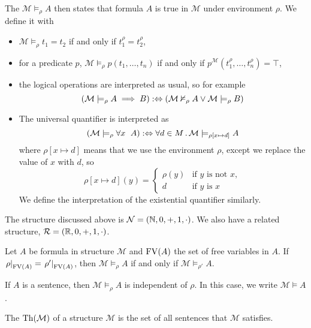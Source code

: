 The  $\mathcal{M} \models_\rho A$ then states
that formula $A$ is true in $\mathcal{M}$ under environment $\rho$.
We define it with
\begin{itemize}
\item $\mathcal{M} \models_\rho t_1 = t_2$ if and only if $t_1^\rho = t_2^\rho$,
\item for a predicate $p$, $\mathcal{M} \models_\rho p(t_1, \ldots, t_n)$ if and
  only if $p^{\mathcal{M}}(t_1^\rho, \ldots, t_n^\rho) = \top$,
\item the logical operations are interpreted as usual, so for example
  \[
	(\mathcal{M} \models_\rho A \implies B)
	:\Leftrightarrow \left(
	  \mathcal{M} \nvDash_\rho A \lor \mathcal{M} \models_\rho B
	\right)
  \]
\item The universal quantifier is interpreted as
  \[
	(\mathcal{M} \models_\rho \forall x \;\  A)
	:\Leftrightarrow \forall d \in M \,.\, \mathcal{M} \models_{\rho[x \mapsto d]} A
  \]
  where $\rho[x \mapsto d]$ means that we use the environment $\rho$, except we
  replace the value of $x$ with $d$, so
  \[
	\rho[x \mapsto d](y) =
	\begin{cases}
	  \rho(y) & \text{if $y$ is not $x$}, \\
	  d & \text{if $y$ is $x$}
	\end{cases}
  \]
  We define the interpretation of the existential quantifier similarly.
\end{itemize}

\begin{example}
  The structure discussed above is $\mathcal{N} = (\mathbb{N}, 0, +, 1, \cdot)$.
  We also have a related structure, $\mathcal{R} = (\mathbb{R}, 0, +, 1, \cdot)$.
\end{example}

\begin{lemma}
  Let $A$ be formula in structure $\mathcal{M}$ and $\operatorname{FV}(A)$ the set of free
  variables in $A$.
  If $\left. \rho \right|_{\operatorname{FV}(A)} = \left. \rho' \right|_{\operatorname{FV}(A)}$, then
  $\mathcal{M} \models_\rho A$ if and only if $\mathcal{M} \models_{\rho'} A$.
\end{lemma}

\begin{corollary}
  If $A$ is a sentence, then $\mathcal{M} \models_\rho A$ is independent of
  $\rho$.
  In this case, we write $\mathcal{M} \models A$.
\end{corollary}

\begin{definition}
  The  $\operatorname{Th}(\mathcal{M})$ of a structure $\mathcal{M}$ is the set
  of all sentences that $\mathcal{M}$ satisfies.
\end{definition}

